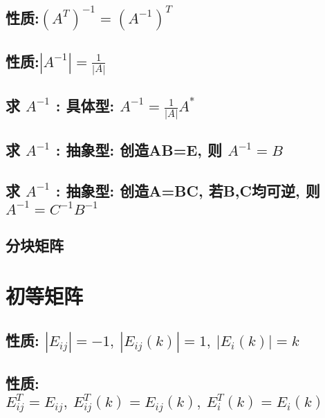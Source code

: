 \documentclass[UTF8]{ctexart}
\begin{document}
		\subsection{性质:$\left( A^T \right) ^{-1}=\left( A^{-1} \right) ^T$}
		
		\subsection{性质:$\left| A^{-1} \right|=\frac{1}{\left| A \right|}$}
		
		\subsection{求 $A^{-1}$ : 具体型: $A^{-1}=\frac{1}{\left| A \right|}A^*$}
		
		\subsection{求 $A^{-1}$ : 抽象型: 创造AB=E, 则 $A^{-1}=B$ }
		
		\subsection{求 $A^{-1}$ : 抽象型: 创造A=BC, 若B,C均可逆, 则 $A^{-1}=C^{-1}B^{-1}$ }
		
		\subsection{分块矩阵}
	
	
	
	
	
	\section{初等矩阵}
	
		\subsection{性质: $ \left| E_{ij} \right|=-1,\ \left| E_{ij}\left( k \right) \right|=1,\ \left| E_i\left( k \right) \right|=k	$}
		
	
		\subsection{性质: $E_{ij}^{T}=E_{ij},\ E_{ij}^{T}\left( k \right) =E_{ij}\left( k \right) ,\ E_{i}^{T}\left( k \right) =E_i\left( k \right) $}		
	
\end{document}
